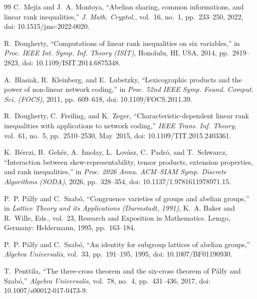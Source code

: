\documentclass[journal]{IEEEtran}
\begin{document}
\begin{thebibliography}{99}
C.~Mej\'ia and J.~A. Montoya,
``Abelian sharing, common informations, and linear rank inequalities,''
\emph{J. Math. Cryptol.}, vol.~16, no.~1, pp.~233--250, 2022,
doi: 10.1515/jmc-2022-0020.


R.~Dougherty,
``Computations of linear rank inequalities on six variables,'' in
\emph{Proc. IEEE Int. Symp. Inf. Theory (ISIT)}, Honolulu, HI, USA, 2014,
pp.~2819--2823, doi: 10.1109/ISIT.2014.6875348.

A.~Blasiak, R.~Kleinberg, and E.~Lubetzky,
``Lexicographic products and the power of non-linear network coding,'' in
\emph{Proc. 52nd IEEE Symp. Found. Comput. Sci. (FOCS)}, 2011,
pp.~609--618, doi: 10.1109/FOCS.2011.39.

R.~Dougherty, C.~Freiling, and K.~Zeger,
``Characteristic-dependent linear rank inequalities with applications to
network coding,'' \emph{IEEE Trans. Inf. Theory}, vol.~61, no.~5,
pp.~2510--2530, May~2015, doi: 10.1109/TIT.2015.2403361.

K.~B\'erczi, B.~Geh\'er, A.~Imolay, L.~Lov\'asz, C.~Padr\'o, and T.~Schwarcz,
``Interaction between skew-representability, tensor products, extension
properties, and rank inequalities,'' in \emph{Proc. 2026 Annu. ACM--SIAM Symp.
Discrete Algorithms (SODA)}, 2026, pp.~328--354,
doi: 10.1137/1.9781611978971.15.

P.~P. P\'alfy and C.~Szab\'o,
``Congruence varieties of groups and abelian groups,'' in \emph{Lattice Theory
and its Applications (Darmstadt, 1991)}, K.~A. Baker and R.~Wille, Eds.,
vol.~23, Research and Exposition in Mathematics. Lemgo, Germany: Heldermann,
1995, pp.~163--184.

P.~P. P\'alfy and C.~Szab\'o,
``An identity for subgroup lattices of abelian groups,''
\emph{Algebra Universalis}, vol.~33, pp.~191--195, 1995,
doi: 10.1007/BF01190930.

T.~Penttila,
``The three-cross theorem and the six-cross theorem of P\'alfy and Szab\'o,''
\emph{Algebra Universalis}, vol.~78, no.~4, pp.~431--436, 2017,
doi: 10.1007/s00012-017-0473-9.

\end{thebibliography}
\end{document}
